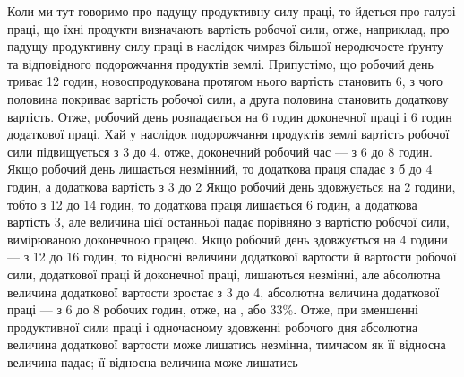 Коли ми тут говоримо про падущу продуктивну силу праці,
то йдеться про галузі праці, що їхні продукти визначають вартість
робочої сили, отже, наприклад, про падущу продуктивну силу
праці в наслідок чимраз більшої неродючосте ґрунту та відповідного
подорожчання продуктів землі. Припустімо, що робочий
день триває 12 годин, новоспродукована протягом нього вартість
становить 6, з чого половина покриває вартість робочої
сили, а друга половина становить додаткову вартість. Отже,
робочий день розпадається на 6 годин доконечної праці і 6 годин
додаткової праці. Хай у наслідок подорожчання продуктів землі
вартість робочої сили підвищується з 3 до 4,
отже, доконечний робочий час — з 6 до 8 годин. Якщо робочий
день лишається незмінний, то додаткова праця спадає з б до 4 годин,
а додаткова вартість з 3 до 2 Якщо робочий день
здовжується на 2 години, тобто з 12 до 14 годин, то додаткова
праця лишається 6 годин, а додаткова вартість 3, але
величина цієї останньої падає порівняно з вартістю робочої сили,
вимірюваною доконечною працею. Якщо робочий день здовжується
на 4 години — з 12 до 16 годин, то відносні величини додаткової
вартости й вартости робочої сили, додаткової праці й
доконечної праці, лишаються незмінні, але абсолютна величина
додаткової вартости зростає з 3 до 4, абсолютна величина
додаткової праці — з 6 до 8 робочих годин, отже, на ,
або 33\%. Отже, при зменшенні продуктивної сили праці
і одночасному здовженні робочого дня абсолютна величина
додаткової вартости може лишатись незмінна, тимчасом як її
відносна величина падає; її відносна величина може лишатись
\parbreak{}  %

